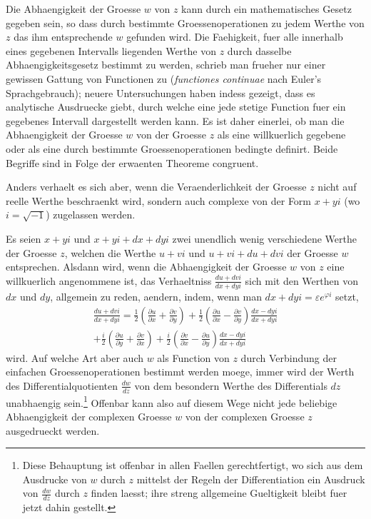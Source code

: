\documentclass[12pt,a4paper]{book}
\theoremstyle{definition}
\theoremstyle{remark}
\begin{document}
Die Abhaengigkeit der Groesse $w$ von $z$ kann durch ein mathematisches Gesetz gegeben sein, so dass durch bestimmte Groessenoperationen zu jedem Werthe von $z$ das ihm entsprechende $w$ gefunden wird. Die Faehigkeit, fuer alle innerhalb eines gegebenen Intervalls liegenden Werthe von $z$ durch dasselbe Abhaengigkeitsgesetz bestimmt zu werden, schrieb man frueher nur einer gewissen Gattung von Functionen zu (\textit{functiones continuae} nach Euler's Sprachgebrauch); neuere Untersuchungen haben indess gezeigt, dass es analytische Ausdruecke giebt, durch welche eine jede stetige Function fuer ein gegebenes Intervall dargestellt werden kann. Es ist daher einerlei, ob man die Abhaengigkeit der Groesse $w$ von der Groesse $z$ als eine willkuerlich gegebene oder als eine durch bestimmte Groessenoperationen bedingte definirt. Beide Begriffe sind in Folge der erwaenten Theoreme congruent.

Anders verhaelt es sich aber, wenn die Veraenderlichkeit der Groesse $z$ nicht auf reelle Werthe beschraenkt wird, sondern auch complexe von der Form $x + yi$ (wo $i = \sqrt{-1}$) zugelassen werden.

Es seien $x + yi$ und $x + yi + dx + dyi$ zwei unendlich wenig verschiedene Werthe der Groesse $z$, welchen die Werthe $u + vi$ und $u + vi + du + dvi$ der Groesse $w$ entsprechen. Alsdann wird, wenn die Abhaengigkeit der Groesse $w$ von $z$ eine willkuerlich angenommene ist, das Verhaeltniss $\frac{du + dvi}{dx + dyi}$ sich mit den Werthen von $dx$ und $dy$, allgemein zu reden, aendern, indem, wenn man $dx + dyi = \varepsilon e^{\varphi i}$ setzt,
\begin{multline*}
\frac{du + dvi}{dx + dyi} = \frac{1}{2}\left(\frac{\partial u}{\partial x} + \frac{\partial v}{\partial y}\right) + \frac{1}{2}\left(\frac{\partial u}{\partial x} - \frac{\partial v}{\partial y}\right) \frac{dx - dyi}{dx + dyi} \\
+ \frac{i}{2}\left(\frac{\partial u}{\partial y} + \frac{\partial v}{\partial x}\right) + \frac{i}{2}\left(\frac{\partial v}{\partial x} - \frac{\partial u}{\partial y}\right) \frac{dx - dyi}{dx + dyi}
\end{multline*}
wird. Auf welche Art aber auch $w$ als Function von $z$ durch Verbindung der einfachen Groessenoperationen bestimmt werden moege, immer wird der Werth des Differentialquotienten $\frac{dw}{dz}$ von dem besondern Werthe des Differentials $dz$ unabhaengig sein.\footnote{Diese Behauptung ist offenbar in allen Faellen gerechtfertigt, wo sich aus dem Ausdrucke von $w$ durch $z$ mittelst der Regeln der Differentiation ein Ausdruck von $\frac{dw}{dz}$ durch $z$ finden laesst; ihre streng allgemeine Gueltigkeit bleibt fuer jetzt dahin gestellt.} Offenbar kann also auf diesem Wege nicht jede beliebige Abhaengigkeit der complexen Groesse $w$ von der complexen Groesse $z$ ausgedrueckt werden.
\end{document}
